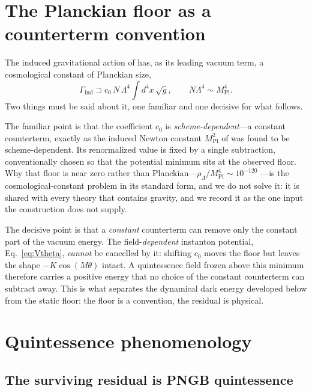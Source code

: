 \documentclass[11pt]{article}
\newcommand{\beq}{\begin{equation}}
\newcommand{\eeq}{\end{equation}}
\newcommand{\Mpl}{M_{\mathrm{Pl}}}
\newcommand{\rhoL}{\rho_\Lambda}
\begin{document}
\section{The Planckian floor as a counterterm convention}
\label{sec:cc}

The induced gravitational action of \cite{Cheng:2026grav} has, as its
leading vacuum term, a cosmological constant of Planckian size,
\beq
\Gamma_{\mathrm{ind}} \supset c_0\, N\,\Lambda^4
\int\! d^4x\,\sqrt{g},
\qquad N\Lambda^4 \sim \Mpl^4 .
\eeq
Two things must be said about it, one familiar and one decisive for
what follows.

The familiar point is that the coefficient $c_0$ is
\emph{scheme-dependent}---a constant counterterm, exactly as the
induced Newton constant $\Mpl^2$ of \cite{Cheng:2026grav} was found to
be scheme-dependent.  Its renormalized value is fixed by a single
subtraction, conventionally chosen so that the potential minimum sits
at the observed floor.  Why that floor is near zero rather than
Planckian---$\rhoL/\Mpl^4 \sim 10^{-120}$
\cite{Weinberg:1988cp}---is the cosmological-constant problem in its
standard form, and we do not solve it: it is shared with every theory
that contains gravity, and we record it as the one input the
construction does not supply.

The decisive point is that a \emph{constant} counterterm can remove
only the constant part of the vacuum energy.  The
field-\emph{dependent} instanton potential, Eq.~\eqref{eq:Vtheta},
\emph{cannot} be cancelled by it: shifting $c_0$ moves the floor but
leaves the shape $-K\cos(M\theta)$ intact.  A quintessence field
frozen above this minimum therefore carries a positive energy that no
choice of the constant counterterm can subtract away.  This is what
separates the dynamical dark energy developed below from the static
floor: the floor is a convention, the residual is physical.

\section{Quintessence phenomenology}
\label{sec:quint}

\subsection{The surviving residual is PNGB quintessence}
\end{document}
